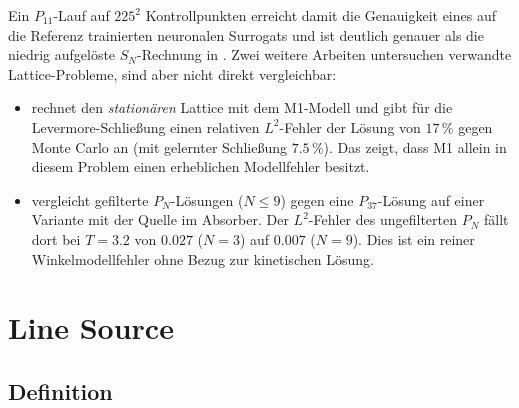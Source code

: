 Ein $P_{11}$-Lauf auf $225^2$ Kontrollpunkten erreicht damit die Genauigkeit eines auf die
Referenz trainierten neuronalen Surrogats und ist deutlich genauer als die niedrig aufgelöste
$S_N$-Rechnung in \cite{gonzales_2026}. Zwei weitere Arbeiten untersuchen verwandte Lattice-Probleme,
sind aber nicht direkt vergleichbar:
\begin{itemize}
  \item \cite{kim_2026} rechnet den \emph{stationären} Lattice mit dem M1-Modell und gibt für die
        Levermore-Schließung einen relativen $L^2$-Fehler der Lösung von $17\,\%$ gegen Monte Carlo
        an (mit gelernter Schließung $7.5\,\%$). Das zeigt, dass M1 allein in diesem Problem einen
        erheblichen Modellfehler besitzt.
  \item \cite{plumridge_2025} vergleicht gefilterte $P_N$-Lösungen ($N\le9$) gegen eine
        $P_{37}$-Lösung auf einer Variante mit der Quelle im Absorber. Der $L^2$-Fehler des
        ungefilterten $P_N$ fällt dort bei $T=3.2$ von $0.027$ ($N=3$) auf $0.007$ ($N=9$). Dies ist
        ein reiner Winkelmodellfehler ohne Bezug zur kinetischen Lösung.
\end{itemize}

\section{Line Source}
\label{sec:tests:linesource}

\subsection{Definition}

